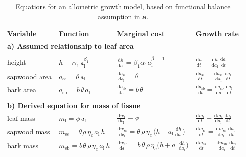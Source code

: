 \documentclass[12pt, a4paper]{article}
\begin{document}
\begin{table}[h]
\caption{Equations for an allometric growth model, based on functional balance assumption in {\textbf a}. }
\centering

{\footnotesize  %
 \begin{doublespace}
  \begin{tabular}{p{2.5cm}p{3.5cm}p{5cm}p{4cm} }\\ \hline
  Variable & Function & Marginal cost & Growth rate\\ \hline
  \multicolumn{4}{l}{\textbf{a) Assumed relationship to leaf area}} \\ \\
  height &
    $h = \alpha_1 \, a_\textrm{l}^{\beta_1}$ &
    $\frac{\textrm{d}h}{\textrm{d}a_\textrm{l}} =  \beta_1 \alpha_1 a_\textrm{l}^{\beta_1-1}$ &
    $\frac{\textrm{d}h}{\textrm{d}t}  = \frac{\textrm{d}h}{\textrm{d}a_\textrm{l}} \, \frac{\textrm{d}a_\textrm{l}}{\textrm{d}t}$ \\
  sapwoood area &
    $a_\textrm{ss} = \theta \, a_\textrm{l}$ &
    $\frac{\textrm{d}a_\textrm{ss}}{\textrm{d} a_\textrm{l}} = \theta$ &
    $\frac{\textrm{d}a_\textrm{ss}}{\textrm{d}t}  =\frac{\textrm{d}a_\textrm{ss}}{\textrm{d} a_\textrm{l}} \, \frac{\textrm{d}a_\textrm{l}}{\textrm{d}t}$ \\
  bark area &
    $a_\textrm{sb} = b \, \theta \, a_\textrm{l}$ &
    $\frac{\textrm{d}a_\textrm{sb}}{\textrm{d} a_\textrm{l}} = b \, \theta$ &
    $\frac{\textrm{d}a_\textrm{sb}}{\textrm{d}t} = \frac{\textrm{d}a_\textrm{sb}}{\textrm{d} a_\textrm{l}} \, \frac{\textrm{d}a_\textrm{l}}{\textrm{d}t}$ \\  \\
  \multicolumn{4}{l}{\textbf{b) Derived equation for mass of tissue }} \\
  leaf mass &
    $m_\textrm{l} = \phi \, a_\textrm{l} $ &
    $\frac{\textrm{d}m_\textrm{l}}{\textrm{d}a_\textrm{l}} = \phi$ &
    $\frac{\textrm{d}m_\textrm{l}}{\textrm{d}t}  = \frac{\textrm{d}m_\textrm{l}}{\textrm{d}a_\textrm{l}}  \, \frac{\textrm{d}a_\textrm{l}}{\textrm{d}t}$ \\
  sapwood mass &
    $m_\textrm{ss} = \theta \, \rho \, \eta_c \, a_\textrm{l} \, h $ &
    $\frac{\textrm{d}m_\textrm{ss}}{\textrm{d}a_\textrm{l}} = \theta\, \rho\, \eta_c\, \big( h + a_\textrm{l}\, \frac{\textrm{d}h}{\textrm{d}a_\textrm{l}} \big)$ &
    $\frac{\textrm{d}m_\textrm{ss}}{\textrm{d}t}  = \frac{\textrm{d}m_\textrm{ss}}{\textrm{d}a_\textrm{l}} \, \frac{\textrm{d}a_\textrm{l}}{\textrm{d}t}$ \\
  bark mass &
    $m_\textrm{sb} = b\, \theta \, \rho \, \eta_c \, a_\textrm{l} \, h $ &
    $\frac{\textrm{d}m_\textrm{sb}}{\textrm{d}a_\textrm{l}} = b \, \theta \, \rho \, \eta_c\big( h + a_\textrm{l} \, \frac{\textrm{d}h}{\textrm{d}a_\textrm{l}} \big)$ &
    $\frac{\textrm{d}m_\textrm{sb}}{\textrm{d}t}  = \frac{\textrm{d}m_\textrm{sb}}{\textrm{d}a_\textrm{l}} \, \frac{\textrm{d}a_\textrm{l}}{\textrm{d}t}$ \\


\end{tabular}
\end{doublespace}}
\end{table}
\end{document}
